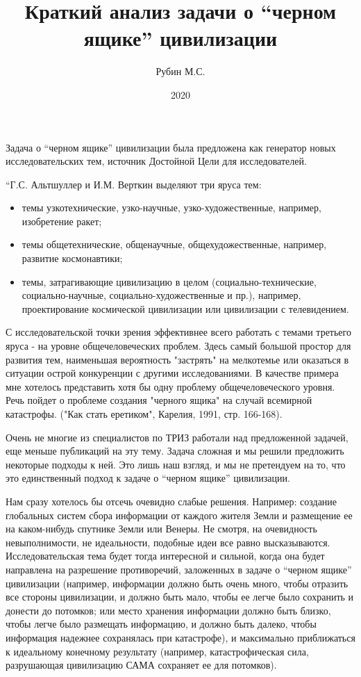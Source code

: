 \documentclass[11pt,a4paper]{article}
\title{Краткий анализ задачи о “черном ящике” цивилизации}
\author{Рубин М.С.}
\date{2020}
\begin{document}
\maketitle

Задача о “черном ящике” цивилизации была предложена как генератор новых
исследовательских тем, источник Достойной Цели для исследователей.  

“Г.С. Альтшуллер и И.М. Верткин выделяют три яруса тем:
\begin{itemize}[noitemsep]
\item темы узкотехнические, узко-научные, узко-художественные, например,
  изобретение ракет;
\item темы общетехнические, общенаучные, общехудожественные, например,
  развитие космонавтики;
\item темы, затрагивающие цивилизацию в целом (социально-технические,
  социально-научные, социально-художественные и пр.), например, проектирование
  космической цивилизации или цивилизации с телевидением.
\end{itemize}
С исследовательской точки зрения эффективнее всего работать с темами третьего
яруса - на уровне общечеловеческих проблем. Здесь самый большой простор для
развития тем, наименьшая вероятность "застрять" на мелкотемье или оказаться в
ситуации острой конкуренции с другими исследованиями. В качестве примера мне
хотелось представить хотя бы одну проблему общечеловеческого уровня. Речь
пойдет о проблеме создания "черного ящика" на случай всемирной катастрофы.
("Как стать еретиком", Карелия, 1991, стр. 166-168).

Очень не многие из специалистов по ТРИЗ работали над предложенной задачей, еще
меньше публикаций на эту тему. Задача сложная и мы решили предложить некоторые
подходы к ней. Это лишь наш взгляд, и мы не претендуем на то, что это
единственный подход к задаче о “черном ящике” цивилизации.

Нам сразу хотелось бы отсечь очевидно слабые решения. Например: создание
глобальных систем сбора информации от каждого жителя Земли и размещение ее на
каком-нибудь спутнике Земли или Венеры. Не смотря, на очевидность
невыполнимости, не идеальности, подобные идеи все равно
высказываются. Исследовательская тема будет тогда интересной и сильной, когда
она будет направлена на разрешение противоречий, заложенных в задаче о “черном
ящике” цивилизации (например, информации должно быть очень много, чтобы
отразить все стороны цивилизации, и должно быть мало, чтобы ее легче было
сохранить и донести до потомков; или место хранения информации должно быть
близко, чтобы легче было размещать информацию, и должно быть далеко, чтобы
информация надежнее сохранялась при катастрофе), и максимально приближаться к
идеальному конечному результату (например, катастрофическая сила, разрушающая
цивилизацию САМА сохраняет ее для потомков).
\end{document}
